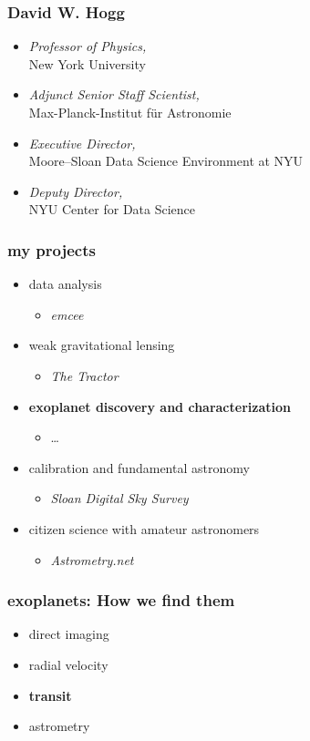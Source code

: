 \documentclass{beamer}
\renewcommand{\emph}[1]{\textbf{#1}}
\newcommand{\project}[1]{\textsl{#1}}
\begin{document}
\begin{frame}
  \frametitle{David W. Hogg}
  \begin{itemize}
  \item \textsl{Professor of Physics,}\\ New York University
  \item \textsl{Adjunct Senior Staff Scientist,}\\ Max-Planck-Institut f\"ur Astronomie
  \item \textsl{Executive Director,}\\ Moore--Sloan Data Science Environment at NYU
  \item \textsl{Deputy Director,}\\ NYU Center for Data Science
  \end{itemize}
\end{frame}

\begin{frame}
  \frametitle{my projects}
  \begin{itemize}
  \item data analysis
    \begin{itemize}
    \item \project{emcee}
    \end{itemize}
  \item weak gravitational lensing
    \begin{itemize}
    \item \project{The Tractor}
    \end{itemize}
  \item \emph{exoplanet discovery and characterization}
    \begin{itemize}
    \item \ldots
    \end{itemize}
  \item calibration and fundamental astronomy
    \begin{itemize}
    \item \project{Sloan Digital Sky Survey}
    \end{itemize}
  \item citizen science with amateur astronomers
    \begin{itemize}
    \item \project{Astrometry.net}
    \end{itemize}
  \end{itemize}
\end{frame}

\begin{frame}
  \frametitle{exoplanets: How we find them}
  \begin{itemize}
  \item direct imaging
  \item radial velocity
  \item \emph{transit}
  \item astrometry
  \end{itemize}
\end{frame}
\end{document}
